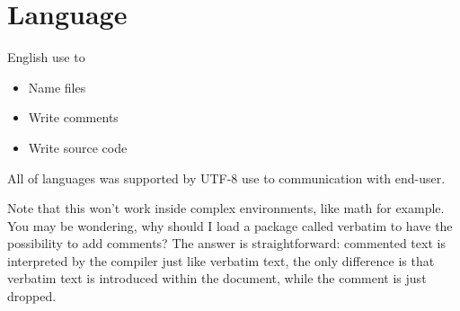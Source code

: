 \chapter{Language}

English use to

\begin{itemize}
\item
Name files
\item
Write comments
\item
Write source code
\end{itemize}

All of languages was supported by UTF-8 use to communication with
\mbox{end-user}.

Note that this won’t work inside complex environments, like math for example.
You may be wondering, why should I load a package called verbatim to have the
possibility to add comments? The answer is straightforward: commented text is
interpreted by the compiler just like verbatim text, the only difference is
that verbatim text is introduced within the document, while the comment is just
dropped.
